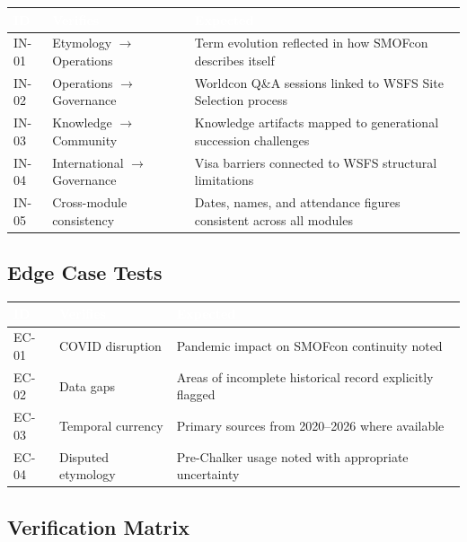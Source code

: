 \documentclass[11pt,letterpaper]{article}
\newcommand{\tableheader}[1]{\textbf{\sffamily\textcolor{white}{#1}}}
\begin{document}
\begin{center}
\begin{tabularx}{\textwidth}{C{1.2cm}L{3cm}X}
\toprule
{}
\tableheader{ID} & \tableheader{Verifies} & \tableheader{Expected} \\
\midrule
IN-01 & Etymology $\rightarrow$ Operations & Term evolution reflected in how SMOFcon describes itself \\
IN-02 & Operations $\rightarrow$ Governance & Worldcon Q\&A sessions linked to WSFS Site Selection process \\
IN-03 & Knowledge $\rightarrow$ Community & Knowledge artifacts mapped to generational succession challenges \\
IN-04 & International $\rightarrow$ Governance & Visa barriers connected to WSFS structural limitations \\
IN-05 & Cross-module consistency & Dates, names, and attendance figures consistent across all modules \\
\bottomrule
\end{tabularx}
\end{center}

\subsection{Edge Case Tests}

\begin{center}
\begin{tabularx}{\textwidth}{C{1.2cm}L{3cm}X}
\toprule
{}
\tableheader{ID} & \tableheader{Verifies} & \tableheader{Expected} \\
\midrule
EC-01 & COVID disruption & Pandemic impact on SMOFcon continuity noted \\
EC-02 & Data gaps & Areas of incomplete historical record explicitly flagged \\
EC-03 & Temporal currency & Primary sources from 2020--2026 where available \\
EC-04 & Disputed etymology & Pre-Chalker usage noted with appropriate uncertainty \\
\bottomrule
\end{tabularx}
\end{center}

\subsection{Verification Matrix}
\end{document}
